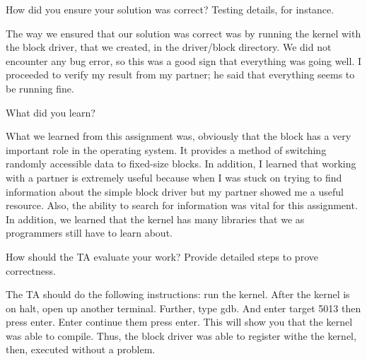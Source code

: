 \documentclass{article}
\newenvironment{question}[2][Question]{\begin{trivlist}
\item[\hskip \labelsep {\bfseries #1}\hskip \labelsep {\bfseries #2.}]}{\end{trivlist}}
\begin{document}

\vspace{0.25in} %

\begin{question}{3}
How did you ensure your solution was correct? Testing details, for instance.
\end{question}
The way we ensured that our solution was correct was by running the kernel with
the block driver, that we created, in the driver/block directory. We did not
encounter any bug error, so this was a good sign that everything was going
well. I proceeded to verify my result from my partner; he said that everything
seems to be running fine.



\vspace{0.25in}
\begin{question}{4}
What did you learn?
\end{question}
What we learned from this assignment was, obviously that the block has a very
important role in the operating system. It provides a method of switching
randomly accessible data to fixed-size blocks. In addition, I learned that
working with a partner is extremely useful because when I was stuck on trying
to find information about the simple block driver but my partner showed me a
useful resource. Also, the ability to search for information was vital for this
assignment. In addition, we learned that the kernel has many libraries that we
as programmers still have to learn about.




\vspace{0.25in}
\begin{question}{5}
How should the TA evaluate your work? Provide detailed steps to prove correctness.
\end{question}
The TA should do the following instructions: run the kernel. After the kernel
is on halt, open up another terminal. Further, type gdb. And enter target 5013
then press enter. Enter continue them press enter. This will show you that the
kernel was able to compile. Thus, the block driver was able to register withe
the kernel, then, executed without a problem.
\end{document}

